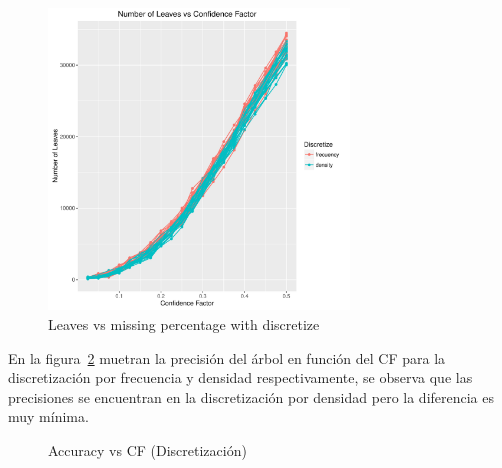 \begin{figure}
  \centering
  \includegraphics[width = 8cm]{6d.pdf}
  \caption{Leaves vs missing percentage with discretize}
  \label{fig:6d}
\end{figure}

En la figura~\ref{fig:discretize} muetran la precisión del árbol en función del CF para la discretización
por frecuencia y densidad respectivamente, se observa que las precisiones se encuentran en la discretización
por densidad pero la diferencia es muy mínima.


\begin{figure}
  \centering
  \caption{Accuracy vs CF (Discretización)}
  \label{fig:discretize}
\end{figure}




